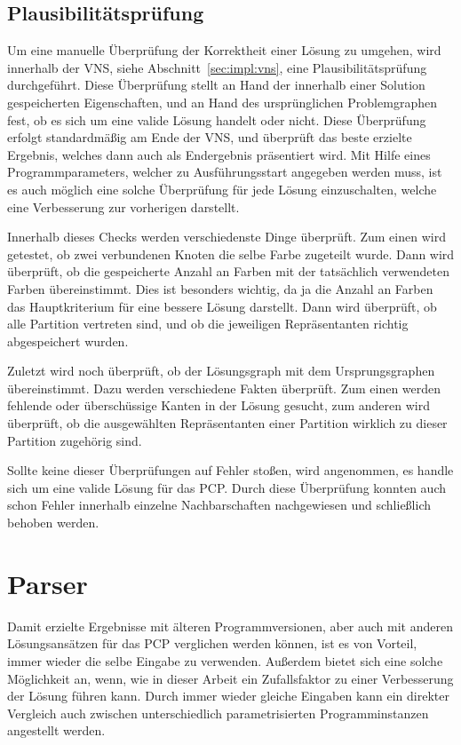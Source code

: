 \subsection{Plausibilitätsprüfung}
\label{sec:plausibility}
Um eine manuelle Überprüfung der Korrektheit einer Lösung zu umgehen, wird innerhalb der VNS, siehe Abschnitt~\ref{sec:impl:vns}, eine Plausibilitätsprüfung durchgeführt. Diese Überprüfung stellt an Hand 
der innerhalb einer Solution gespeicherten Eigenschaften, und an Hand des ursprünglichen Problemgraphen fest, ob es sich um eine valide Lösung handelt oder nicht. Diese Überprüfung erfolgt standardmäßig
am Ende der VNS, und überprüft das beste erzielte Ergebnis, welches dann auch als Endergebnis präsentiert wird. Mit Hilfe eines Programmparameters, welcher zu Ausführungsstart angegeben werden muss, ist es
auch möglich eine solche Überprüfung für jede Lösung einzuschalten, welche eine Verbesserung zur vorherigen darstellt. 

Innerhalb dieses Checks werden verschiedenste Dinge überprüft. Zum einen wird getestet, ob zwei verbundenen Knoten die selbe Farbe zugeteilt wurde. Dann wird überprüft, ob die gespeicherte Anzahl an Farben
mit der tatsächlich verwendeten Farben übereinstimmt. Dies ist besonders wichtig, da ja die Anzahl an Farben das Hauptkriterium für eine bessere Lösung darstellt. Dann wird überprüft, ob alle Partition
vertreten sind, und ob die jeweiligen Repräsentanten richtig abgespeichert wurden. 

Zuletzt wird noch überprüft, ob der Lösungsgraph mit dem Ursprungsgraphen übereinstimmt. Dazu werden verschiedene Fakten überprüft. Zum einen werden fehlende oder überschüssige Kanten in der Lösung gesucht, 
zum anderen wird überprüft, ob die ausgewählten Repräsentanten einer Partition wirklich zu dieser Partition zugehörig sind. 

Sollte keine dieser Überprüfungen auf Fehler stoßen, wird angenommen, es handle sich um eine valide Lösung für das PCP\@. Durch diese Überprüfung konnten auch schon Fehler innerhalb einzelne Nachbarschaften 
nachgewiesen und schließlich behoben werden.


\section{Parser}
\label{sec:parser}

Damit erzielte Ergebnisse mit älteren Programmversionen, aber auch mit anderen Lösungs\-ansätzen für das PCP verglichen werden können, ist es von
Vorteil, immer wieder die selbe Eingabe zu verwenden. Außerdem bietet sich eine solche Möglichkeit an, wenn, wie in dieser Arbeit ein Zufallsfaktor
zu einer Verbesserung der Lösung führen kann. Durch immer wieder gleiche Eingaben kann ein direkter Vergleich auch zwischen unterschiedlich
parametrisierten Programminstanzen angestellt werden.

